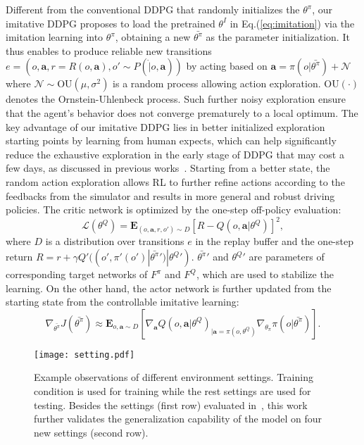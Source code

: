 \documentclass[runningheads]{llncs}
\begin{document}
Different from the conventional DDPG that randomly initializes the $\theta^\pi$, our imitative DDPG proposes to load the pretrained $\theta^I$ in Eq.(\ref{eq:imitation}) via the imitation learning into $\theta^\pi$, obtaining a new $\bar{\theta^\pi}$ as the parameter initialization. It thus enables to produce reliable new transitions $e = (o, \mathbf{a}, r=R(o,\mathbf{a}), o'\sim P(\dot|o,\mathbf{a}))$ by acting based on $\mathbf{a}=\pi(o|\bar{\theta^\pi}) + \mathcal{N}$ where $\mathcal{N}\sim \text{OU}(\mu,\sigma^2)$ is a random process allowing action exploration. $\text{OU}(\cdot)$ denotes the Ornstein-Uhlenbeck process. Such further noisy exploration ensure that the agent’s behavior does not converge prematurely to a local optimum. The key advantage of our imitative DDPG lies in better initialized exploration starting points by learning from human expects, which can help significantly reduce the exhaustive exploration in the early stage of DDPG that may cost a few days, as discussed in previous works~\cite{plappert2017parameter}. Starting from a better state, the random action exploration allows RL to further refine actions according to the feedbacks from the simulator and results in more general and robust driving policies. The critic network is optimized by the one-step off-policy evaluation:
\begin{equation}
\mathcal{L}(\theta^Q) = \mathbf{E}_{(o,\mathbf{a}, r, o')\sim D}[R - Q(o,\mathbf{a} | \theta^Q)]^2,
\end{equation}
where $D$ is a distribution over transitions $e$ in the replay buffer and the one-step return $R = r + \gamma Q'((o', \pi'(o')|\bar{\theta^\pi}')|{\theta^Q}')$. $\bar{\theta^\pi}'$ and ${\theta^Q}'$ are parameters of corresponding target networks of $F^\pi$ and $F^Q$, which are used to stabilize the learning. On the other hand, the actor network is further updated from the starting state from the controllable imitative learning: 
\begin{equation}
\nabla_{\bar{\theta^\pi}}J(\bar{\theta^\pi})\approx\mathbf{E}_{o,\mathbf{a}\sim D}[\nabla_\mathbf{a}Q(o,\mathbf{a}|\theta^Q)_{|\mathbf{a}=\pi(o,\theta^Q)}\nabla_{\theta_\pi}\pi(o|\bar{\theta^\pi})].
\end{equation}

\begin{figure*}[!tp]
        \begin{center}
     \texttt{[image: setting.pdf]}\vspace{-3mm}
            \caption{Example observations of different environment settings. Training condition is used for training while the rest settings are used for testing. Besides the settings (first row) evaluated in~\cite{dosovitskiy2017carla}, this work further validates the generalization capability of the model on four new settings (second row).}\vspace{-6mm}
            \label{fig:environments}
        \end{center}
    \end{figure*}
    
\end{document}
